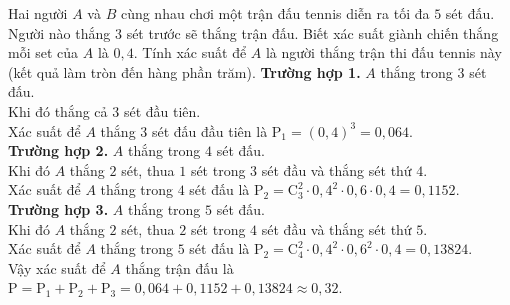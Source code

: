 \begin{ex}%
Hai người $A$ và $B$ cùng nhau chơi một trận đấu tennis diễn ra tối đa $5$ sét đấu. Người nào thắng $3$ sét trước sẽ thắng trận đấu. Biết xác suất giành chiến thắng mỗi set của $A$ là $0{,}4$. Tính xác suất để $A$ là người thắng trận thi đấu tennis này (kết quả làm tròn đến hàng phần trăm).
\loigiai
{
\textbf{Trường hợp 1.} $A$ thắng trong $3$ sét đấu. \\
Khi đó thắng cả $3$ sét đầu tiên. \\
Xác suất để $A$ thắng $3$ sét đấu đầu tiên là $\mathrm{P}_{1}=\left(0{,}4\right)^3=0{,}064$. \\
\textbf{Trường hợp 2.} $A$ thắng trong $4$ sét đấu. \\
Khi đó $A$ thắng $2$ sét, thua $1$ sét trong $3$ sét đầu và thắng sét thứ $4$. \\
Xác suất để $A$ thắng trong $4$ sét đấu là $\mathrm{P}_{2}=\mathrm{C}_{3}^{2}\cdot0{,}4^2\cdot0{,}6\cdot0{,}4=0{,}1152$. \\
\textbf{Trường hợp 3.} $A$ thắng trong $5$ sét đấu. \\
Khi đó $A$ thắng $2$ sét, thua $2$ sét trong $4$ sét đầu và thắng sét thứ $5$. \\
Xác suất để $A$ thắng trong $5$ sét đấu là $\mathrm{P}_{2}=\mathrm{C}_{4}^{2}\cdot0{,}4^2\cdot0{,}6^2\cdot0{,}4=0{,}13824$. \\
Vậy xác suất để $A$ thắng trận đấu là $\mathrm{P}=\mathrm{P}_{1}+\mathrm{P}_{2}+\mathrm{P}_{3}=0{,}064+0{,}1152+0{,}13824\approx0{,}32$.
}
\end{ex}

